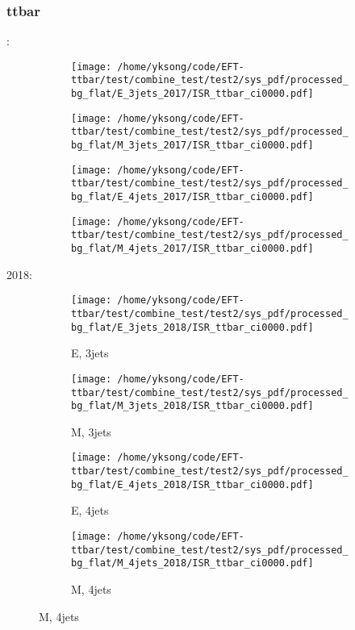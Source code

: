 \documentclass{beamer}
\begin{document}
\begin{frame}
\frametitle{ttbar}
\fontsize{5}{1}:
\begin{figure}
\centering
\begin{subfigure}[b]{0.24\textwidth}
\texttt{[image: /home/yksong/code/EFT-ttbar/test/combine\_test/test2/sys\_pdf/processed\_bg\_flat/E\_3jets\_2017/ISR\_ttbar\_ci0000.pdf]}
\end{subfigure}
\begin{subfigure}[b]{0.24\textwidth}
\texttt{[image: /home/yksong/code/EFT-ttbar/test/combine\_test/test2/sys\_pdf/processed\_bg\_flat/M\_3jets\_2017/ISR\_ttbar\_ci0000.pdf]}
\end{subfigure}
\begin{subfigure}[b]{0.24\textwidth}
\texttt{[image: /home/yksong/code/EFT-ttbar/test/combine\_test/test2/sys\_pdf/processed\_bg\_flat/E\_4jets\_2017/ISR\_ttbar\_ci0000.pdf]}
\end{subfigure}
\begin{subfigure}[b]{0.24\textwidth}
\texttt{[image: /home/yksong/code/EFT-ttbar/test/combine\_test/test2/sys\_pdf/processed\_bg\_flat/M\_4jets\_2017/ISR\_ttbar\_ci0000.pdf]}
\end{subfigure}
\end{figure}
2018:
\begin{figure}
\centering
\begin{subfigure}[b]{0.24\textwidth}
\texttt{[image: /home/yksong/code/EFT-ttbar/test/combine\_test/test2/sys\_pdf/processed\_bg\_flat/E\_3jets\_2018/ISR\_ttbar\_ci0000.pdf]}
\captionsetup{font=tiny}
\caption{E, 3jets}
\end{subfigure}
\begin{subfigure}[b]{0.24\textwidth}
\texttt{[image: /home/yksong/code/EFT-ttbar/test/combine\_test/test2/sys\_pdf/processed\_bg\_flat/M\_3jets\_2018/ISR\_ttbar\_ci0000.pdf]}
\captionsetup{font=tiny}
\caption{M, 3jets}
\end{subfigure}
\begin{subfigure}[b]{0.24\textwidth}
\texttt{[image: /home/yksong/code/EFT-ttbar/test/combine\_test/test2/sys\_pdf/processed\_bg\_flat/E\_4jets\_2018/ISR\_ttbar\_ci0000.pdf]}
\captionsetup{font=tiny}
\caption{E, 4jets}
\end{subfigure}
\begin{subfigure}[b]{0.24\textwidth}
\texttt{[image: /home/yksong/code/EFT-ttbar/test/combine\_test/test2/sys\_pdf/processed\_bg\_flat/M\_4jets\_2018/ISR\_ttbar\_ci0000.pdf]}
\captionsetup{font=tiny}
\caption{M, 4jets}
\end{subfigure}
\end{figure}
\end{frame}
\end{document}
